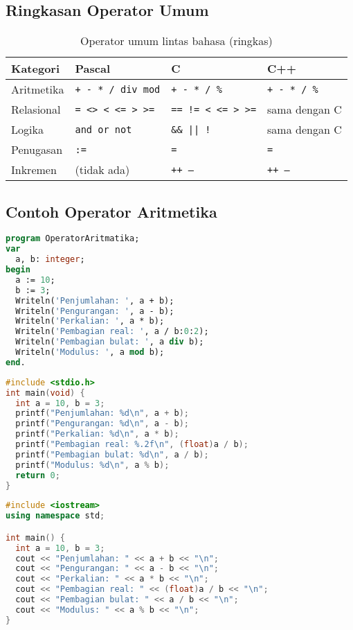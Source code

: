 \documentclass[../main.tex]{subfiles}
\begin{document}
\subsection{Ringkasan Operator Umum}
\begin{table}[H]
  \centering
  \caption{Operator umum lintas bahasa (ringkas)}
  \begin{tabular}{@{}llll@{}}
    \toprule
    Kategori & Pascal & C & C++ \\
    \midrule
    Aritmetika & \texttt{+ - * / div mod} & \texttt{+ - * / \%} & \texttt{+ - * / \%} \\
    Relasional & \texttt{= {\textless}{\textgreater} {\textless} {\textless}= {\textgreater} {\textgreater}=} & \texttt{== != {\textless} {\textless}= {\textgreater} {\textgreater}=} & sama dengan C \\
    Logika & \texttt{and or not} & \texttt{\&\& || !} & sama dengan C \\
    Penugasan & \texttt{:=} & \texttt{=} & \texttt{=} \\
    Inkremen & (tidak ada) & \texttt{++ --} & \texttt{++ --} \\
    \bottomrule
  \end{tabular}
\end{table}

\subsection{Contoh Operator Aritmetika}
\begin{lstlisting}[language=Pascal, caption={Operator aritmetika di Pascal}]
program OperatorAritmatika;
var
  a, b: integer;
begin
  a := 10;
  b := 3;
  Writeln('Penjumlahan: ', a + b);
  Writeln('Pengurangan: ', a - b);
  Writeln('Perkalian: ', a * b);
  Writeln('Pembagian real: ', a / b:0:2);
  Writeln('Pembagian bulat: ', a div b);
  Writeln('Modulus: ', a mod b);
end.
\end{lstlisting}

\begin{lstlisting}[language=C, caption={Operator aritmetika di C}]
#include <stdio.h>
int main(void) {
  int a = 10, b = 3;
  printf("Penjumlahan: %d\n", a + b);
  printf("Pengurangan: %d\n", a - b);
  printf("Perkalian: %d\n", a * b);
  printf("Pembagian real: %.2f\n", (float)a / b);
  printf("Pembagian bulat: %d\n", a / b);
  printf("Modulus: %d\n", a % b);
  return 0;
}
\end{lstlisting}

\begin{lstlisting}[language=C++, caption={Operator aritmetika di C++}]
#include <iostream>
using namespace std;

int main() {
  int a = 10, b = 3;
  cout << "Penjumlahan: " << a + b << "\n";
  cout << "Pengurangan: " << a - b << "\n";
  cout << "Perkalian: " << a * b << "\n";
  cout << "Pembagian real: " << (float)a / b << "\n";
  cout << "Pembagian bulat: " << a / b << "\n";
  cout << "Modulus: " << a % b << "\n";
}
\end{lstlisting}
\end{document}
